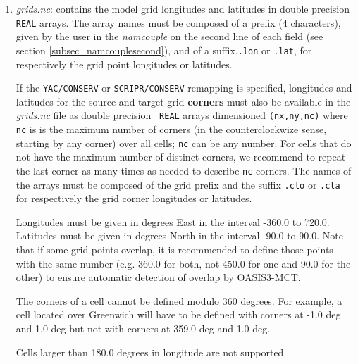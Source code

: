 \begin{enumerate}

\item {\em grids.nc}: contains the model grid longitudes and latitudes
  in double precision {\tt REAL} arrays. The array names must be 
  composed of a prefix (4 characters), given by the user in the {\it
    namcouple} on the second line of each field (see section
  \ref{subsec_namcouplesecond}), and of a suffix,{\tt .lon} or {\tt .lat}, for respectively the grid point
  longitudes or latitudes.

  If the {\tt YAC/CONSERV} or {\tt SCRIPR/CONSERV} remapping is specified, longitudes and
  latitudes for the source and target grid {\bf corners} must also be
  available in the {\em grids.nc} file as double precision {\tt
    REAL} arrays dimensioned {\tt (nx,ny,nc)}
  where {\tt nc} is is the maximum number of corners 
  (in the counterclockwize sense, starting by any corner) over all cells; 
   {\tt nc} can be any number. For cells that do not have the maximum 
  number of distinct corners, we recommend to repeat the last corner 
  as many times as needed to describe  {\tt nc} corners.
  The names of the arrays must be composed of the grid prefix
  and the suffix {\tt .clo} or {\tt .cla} for respectively the grid corner
  longitudes or latitudes.  

 
  Longitudes must be given in degrees East in the interval -360.0 to
  720.0. Latitudes must be given in degrees North in the interval
  -90.0 to 90.0. Note that if some grid points overlap, it is
  recommended to define those points with the same number (e.g. 360.0
  for both, not 450.0 for one and 90.0 for the other) to ensure
  automatic detection of overlap by OASIS3-MCT.
 
  The corners of a cell cannot be defined modulo 360 degrees. For
  example, a cell located over Greenwich will have to be defined with
  corners at -1.0 deg and 1.0 deg but not with corners at 359.0 deg
  and 1.0 deg.
 
  Cells larger than 180.0 degrees in longitude are not supported.
  

\end{enumerate}
